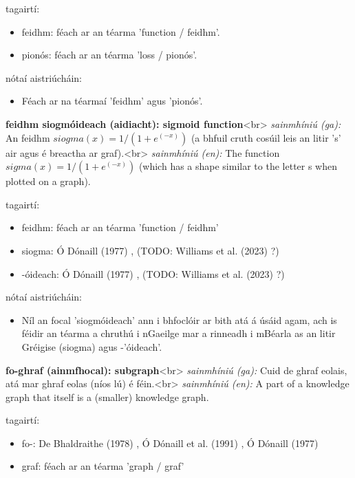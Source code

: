 \documentclass{article}
\begin{document}
tagairtí:
\begin{itemize}
	\item feidhm: féach ar an téarma 'function / feidhm'.
	\item pionós: féach ar an téarma 'loss / pionós'.
\end{itemize}

nótaí aistriúcháin:
\begin{itemize}
	\item Féach ar na téarmaí 'feidhm' agus 'pionós'.
\end{itemize}


\textbf{feidhm siogmóideach (aidiacht): sigmoid function}<br>
\textit{sainmhíniú (ga):} An feidhm $siogma(x) = 1 / (1 + e^(-x))$ (a bhfuil cruth cosúil leis an litir 's' air agus é breactha ar graf).<br>
\textit{sainmhíniú (en):} The function $sigma(x) = 1 / (1 + e^(-x))$ (which has a shape similar to the letter s when plotted on a graph).

tagairtí:
\begin{itemize}
	\item feidhm: féach ar an téarma 'function / feidhm'
	\item siogma: Ó Dónaill (1977) \cite{odonaill}, (TODO: Williams et al. (2023) \cite{storchiste}?)
	\item -óideach: Ó Dónaill (1977) \cite{odonaill}, (TODO: Williams et al. (2023) \cite{storchiste}?)
\end{itemize}

nótaí aistriúcháin:
\begin{itemize}
	\item Níl an focal 'siogmóideach' ann i bhfoclóir ar bith atá á úsáid agam, ach is féidir an téarma a chruthú i nGaeilge mar a rinneadh i mBéarla as an litir Gréigise (siogma) agus -'óideach'.
\end{itemize}


\textbf{fo-ghraf (ainmfhocal): subgraph}<br>
\textit{sainmhíniú (ga):} Cuid de ghraf eolais, atá mar ghraf eolas (níos lú) é féin.<br>
\textit{sainmhíniú (en):} A part of a knowledge graph that itself is a (smaller) knowledge graph.

tagairtí:
\begin{itemize}
	\item fo-: De Bhaldraithe (1978) \cite{de-bhaldraithe}, Ó Dónaill et al. (1991) \cite{focloir-beag}, Ó Dónaill (1977) \cite{odonaill}
	\item graf: féach ar an téarma 'graph / graf'
\end{itemize}
\end{document}
